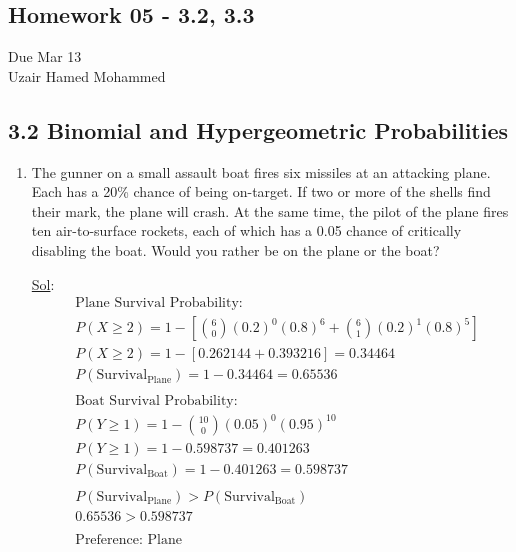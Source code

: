 \begin{center}
  \section*{Homework 05 - 3.2, 3.3}
  Due Mar 13 \\
  Uzair Hamed Mohammed
\end{center}


\subsection*{3.2 Binomial and Hypergeometric Probabilities}
\begin{enumerate}
  \item[10.] The gunner on a small assault boat fires six missiles at
    an attacking plane. Each has a 20\% chance of being on-target. If
    two or more of the shells find their mark, the plane will crash.
    At the same time, the pilot of the plane fires ten air-to-surface
    rockets, each of which has a 0.05 chance of critically disabling
    the boat. Would you rather be on the plane or the boat?

    \underline{Sol}:\\
    $$
    \begin{aligned}
      & \text{Plane Survival Probability: } \\
      & P(X \ge 2) = 1 - \left[ \binom{6}{0} (0.2)^0 (0.8)^6 +
      \binom{6}{1} (0.2)^1 (0.8)^5 \right] \\
      & P(X \ge 2) = 1 - [0.262144 + 0.393216] = 0.34464 \\
      & P(\text{Survival}_{\text{Plane}}) = 1 - 0.34464 = 0.65536 \\
      \\
      & \text{Boat Survival Probability: } \\
      & P(Y \ge 1) = 1 - \binom{10}{0} (0.05)^0 (0.95)^{10} \\
      & P(Y \ge 1) = 1 - 0.598737 = 0.401263 \\
      & P(\text{Survival}_{\text{Boat}}) = 1 - 0.401263 = 0.598737 \\
      \\
      & P(\text{Survival}_{\text{Plane}}) > P(\text{Survival}_{\text{Boat}}) \\
      & 0.65536 > 0.598737 \\
      \\
      & \boxed{\text{Preference: Plane}}
    \end{aligned}$$


\end{enumerate}
